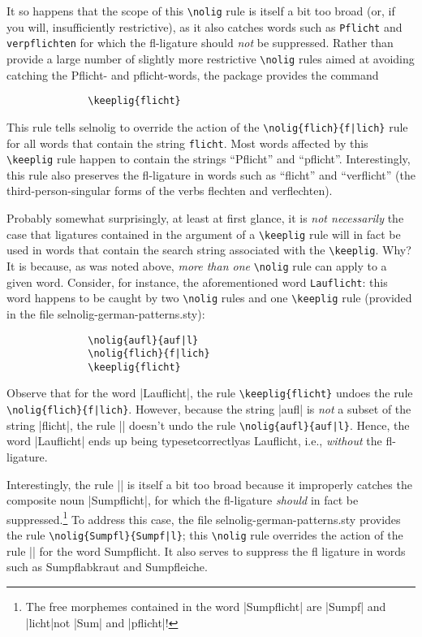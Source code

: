 \documentclass[11pt]{article}
\newcommand{\pkg}[1]{\textsf{#1}}
\newcommand{\opt}[1]{\texttt{#1}}
\newcommand{\cmmd}[1]{\texttt{\textbackslash #1}}
\begin{document}

It so happens that the scope of this \cmmd{nolig} rule is itself a bit too broad (or, if you will, insufficiently restrictive), as it also catches words such as \opt{Pflicht} and \opt{verpflichten} for which the fl-ligature should \emph{not} be suppressed. Rather than provide a large number of slightly more restrictive \cmmd{nolig} rules aimed at avoiding catching the Pflicht- and pflicht-words, the package provides the command
\begin{Verbatim}
              \keeplig{flicht}
\end{Verbatim}
This rule tells \pkg{selnolig} to override the action of the \Verb+\nolig{flich}{f|lich}+ rule for all words that contain the string \opt{flicht}. Most words affected by this \cmmd{keeplig} rule happen to contain the strings \enquote{Pflicht} and \enquote{pflicht}. Interestingly, this rule also preserves the fl-ligature in words such as \enquote{flicht} and \enquote{verflicht} (the third-person-singular forms of the verbs flechten and verflechten). 

Probably somewhat surprisingly, at least at first glance, it is \emph{not necessarily} the case that ligatures contained in the argument of a \cmmd{keeplig} rule will in fact be used in words that contain the search string associated with the \cmmd{keeplig}. Why? It is because, as was noted above, \emph{more than one} \cmmd{nolig} rule can apply to a given word. Consider, for instance, the aforementioned word \opt{Lauflicht}: this word happens to be caught by two \cmmd{nolig} rules and one \cmmd{keeplig} rule (provided in the file \pkg{selnolig-german-patterns.sty}):
\begin{Verbatim}
              \nolig{aufl}{auf|l}
              \nolig{flich}{f|lich}
              \keeplig{flicht}
\end{Verbatim}
Observe that for the word |Lauflicht|, the rule \Verb+\keeplig{flicht}+ undoes the rule \Verb+\nolig{flich}{f|lich}+. However, because the string |aufl| is \emph{not} a subset of the string |flicht|, the rule || doesn't undo the rule \Verb+\nolig{aufl}{auf|l}+. Hence, the word |Lauflicht| ends up being typeset\textemdash correctly\textemdash as Lauflicht, i.e., \emph{without} the fl-ligature. 

Interestingly, the rule || is itself a bit too broad because it improperly catches the composite noun |Sumpflicht|, for which the fl-ligature \emph{should} in fact be suppressed.\footnote{The free morphemes contained in the word |Sumpflicht| are |Sumpf| and |licht|\textemdash not |Sum| and |pflicht|!} To address this case, the file \pkg{selnolig-german-patterns.sty} provides the rule \Verb+\nolig{Sumpfl}{Sumpf|l}+; this \cmmd{nolig} rule overrides the action of the rule || for the word Sumpflicht. It also serves to suppress the fl ligature in words such as Sumpflabkraut and Sumpfleiche.
\end{document}
